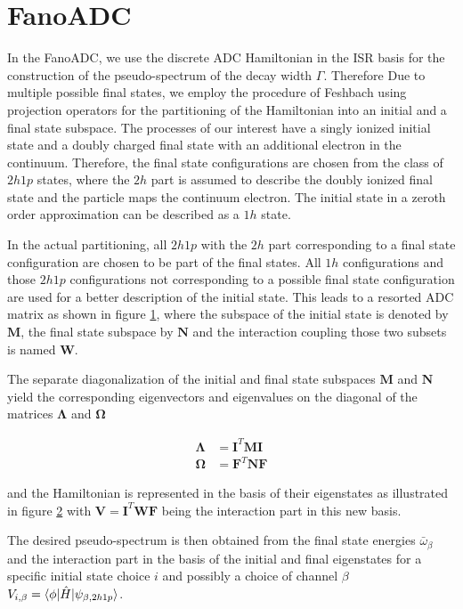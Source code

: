 \section{FanoADC}
In the FanoADC, we use the discrete ADC Hamiltonian in the \ac{ISR}
basis for the construction of the pseudo-spectrum of the decay width
$\Gamma$.
Therefore
Due to multiple possible final states, we employ the procedure
of Feshbach using projection operators for the partitioning of the Hamiltonian
into an initial and a final state subspace.
The processes of our interest have a singly ionized initial state and a
doubly charged final state with an additional electron in the continuum.
Therefore, the final state configurations are chosen from
the class of $2h1p$ states, where the $2h$ part is assumed to
describe the doubly ionized final state and the particle maps the continuum electron.
The initial state in a zeroth order approximation can be described as a $1h$ state.

In the actual partitioning, all $2h1p$ with the $2h$ part corresponding to
a final state configuration are chosen to be part of the final states.
All $1h$ configurations and those $2h1p$ configurations not corresponding
to a possible final state configuration are used for a better description
of the initial state. This leads to a resorted \ac{ADC} matrix as shown in
figure \ref{figure:fano_matsort}, where the subspace of the initial state
is denoted by $\mathbf{M}$, the final state subspace by $\mathbf{N}$ and
the interaction coupling those two subsets is named $\mathbf{W}$.

\begin{figure}[h]
  \centering
  
  \caption{}
  \label{figure:fano_matsort}
\end{figure}

The separate diagonalization of the initial and final state subspaces
$\mathbf{M}$ and $\mathbf{N}$ yield
the corresponding eigenvectors and eigenvalues on the diagonal of the
matrices $\mathbf{\Lambda}$ and $\mathbf{\Omega}$

\begin{align}
  \mathbf{\Lambda} &= \mathbf{I}^T \mathbf{M} \mathbf{I}  \\
  \mathbf{\Omega}  &= \mathbf{F}^T \mathbf{N} \mathbf{F} 
\end{align}

and the Hamiltonian is represented in the basis of their eigenstates
as illustrated in
figure \ref{figure:fano_bastrans} with $\mathbf{V} = \mathbf{I}^T \mathbf{W} \mathbf{F}$
being the interaction part
in this new basis.

\begin{figure}[h]
  \centering
  
  \caption{}
  \label{figure:fano_bastrans}
\end{figure}
The desired pseudo-spectrum is then obtained from the final state energies
$\bar{\omega}_\beta$ and the interaction part in the basis of the initial and
final eigenstates for a specific initial state choice $i$ and possibly a choice
of channel $\beta$
$V_{i,\beta} = \braket{\phi |\hat{H}| \psi_{\beta, 2h1p}}$.

